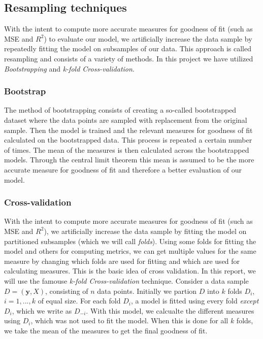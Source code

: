 \documentclass[twocolumn,english,notitlepage]{article}
\renewcommand{\vec}[1]{\boldsymbol{#1}}
\begin{document}
    \subsection{Resampling techniques}
    With the intent to compute more accurate measures for goodness of fit (such as MSE and $R^2$) to evaluate our model, we 
    artificially increase the data sample by repeatedly fitting the model on subsamples of our data. This approach is called resampling and consists of a variety of methods. In this project we have utilized \textit{Bootstrapping} and \textit{k-fold Cross-validation}. 

        \subsubsection{Bootstrap}
        The method of bootstrapping consists of creating a so-called bootstrapped dataset where the data points are sampled with replacement from the original sample. Then the model is trained and the relevant measures for goodness of fit calculated on the bootstrapped data. This process is repeated a certain number of times. The mean of the measures is then calculated across the bootstrapped models. Through the central limit theorem this mean is assumed to be the more accurate measure for goodness of fit and therefore a better evaluation of our model.  

        \subsubsection{Cross-validation}
        With the intent to compute more accurate measures for goodness of fit (such as MSE and $R^2$), we 
        artificially increase the data sample by fitting the model on partitioned subsamples (which we will call \textit{folds}). Using some folds
        for fitting the model and others for computing metrics, we can get multiple values for the same measure by changing which folds are used for fitting 
        and which are used for calculating measures. This is the basic idea of cross validation.
        \newline\newline
        In this report, we will use the famouse \textit{k-fold Cross-validation} technique. Consider a data sample $D = (\vec{y}, X)$, consisting of $n$ data points. Initially we partion $D$ into $k$ folds $D_i$, $i = 1, ... , k$ of equal size.   
        For each fold $D_i$, a model is fitted using every fold \textit{except} $D_i$, which we write as $D_{-i}$. With this model, we calcualte the different measures 
        using $D_i$, which was not used to fit the model. When this is done for all $k$ folds, we take the mean of the measures to get the 
        final goodness of fit. 
\end{document}
